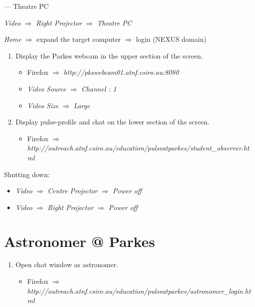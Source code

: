 \documentclass{article}
\begin{document}
\begin{description}
\item[Right Projector] --- Theatre PC
\item \emph{Video} $\Rightarrow$ \emph{Right Projector} $\Rightarrow$ \emph{Theatre PC}
\item \emph{Home} $\Rightarrow$ expand the target computer $\Rightarrow$ login (NEXUS domain)
\begin{enumerate}
\item Display the Parkes webcam in the upper section of the screen.
\begin{itemize}
\item Firefox $\Rightarrow$ \emph{http://pkswebcam01.atnf.csiro.au:8080}
\item \emph{Video Source} $\Rightarrow$ \emph{Channel : 1}
\item \emph{Video Size} $\Rightarrow$ \emph{Large}
\end{itemize}
\item Display pulse-profile and chat on the lower section of the screen.
\begin{itemize}
\item Firefox $\Rightarrow$ \emph{http://outreach.atnf.csiro.au/education/pulseatparkes/student\_observer.html}
\end{itemize}


\end{enumerate}

\end{description}
Shutting down:
\begin{itemize}
\item \emph{Video} $\Rightarrow$ \emph{Centre Projector} $\Rightarrow$ \emph{Power off}
\item \emph{Video} $\Rightarrow$ \emph{Right Projector} $\Rightarrow$ \emph{Power off}
\end{itemize}

\section{Astronomer @ Parkes}
\begin{enumerate}
\item Open chat window as astronomer.
\begin{itemize}
\item Firefox $\Rightarrow$ \emph{http://outreach.atnf.csiro.au/education/pulseatparkes/astronomer\_login.html}
\end{itemize}
\end{enumerate}
\end{document}
